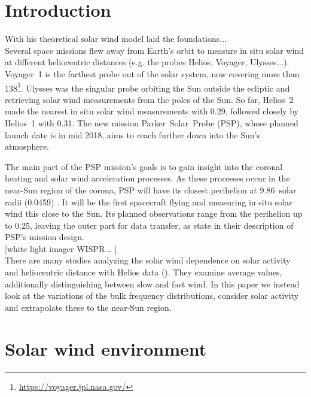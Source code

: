 \section{Introduction}

With his theoretical solar wind model \citet{Parker1958} laid the foundations...\\

Several space missions flew away from Earth's orbit to measure in situ solar wind at different heliocentric distances (e.g. the probes Helios, Voyager, Ulysses...). Voyager~1 is the farthest probe out of the solar system, now covering more than \SI{138}{\au}\footnote{\url{https://voyager.jpl.nasa.gov/}}. Ulysses was the singular probe orbiting the Sun outside the ecliptic and retrieving solar wind measurements from the poles of the Sun. So far, Helios~2 made the nearest in situ solar wind measurements with \SI{0.29}{\au}, followed closely by Helios~1 with \SI{0.31}{\au}. The new mission Parker~Solar~Probe (PSP), whose planned launch date is in mid 2018, aims to reach further down into the Sun's atmosphere.

The main part of the PSP mission's goals is to gain insight into the coronal heating and solar wind acceleration processes. As these processes occur in the near-Sun region of the corona, PSP will have its closest perihelion at 9.86~solar radii (\SI{0.0459}{\au}) \citep{Fox2015}. It will be the first spacecraft flying and measuring in situ solar wind this close to the Sun. Its planned observations range from the perihelion up to \SI{0.25}{\au}, leaving the outer part for data transfer, as \citet{Fox2015} state in their description of PSP's mission design.\\

[white light imager WISPR... \citep{Vourlidas2016}]\\

There are many studies analyzing the solar wind dependence on solar activity and heliocentric distance with Helios data (\citet{Schwenn1983, Bougeret1984, Schwenn1990}). They examine average values, additionally distinguishing between slow and fast wind. In this paper we instead look at the variations of the bulk frequency distributions, consider solar activity and extrapolate these to the near-Sun region.\\


\section{Solar wind environment}

